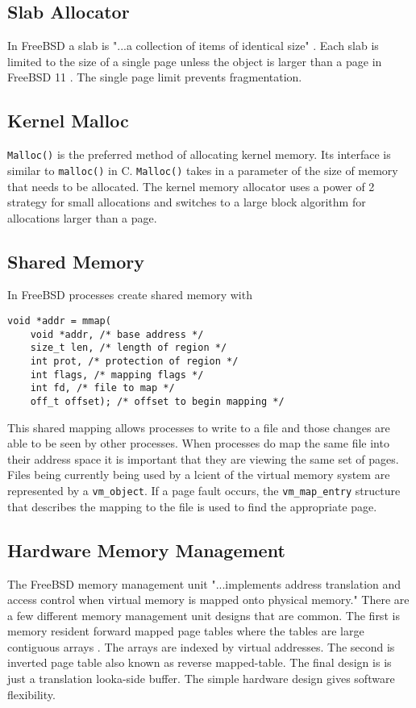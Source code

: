 \subsection{Slab Allocator} 
In FreeBSD a slab is "...a collection of items of identical size" \cite{Freebsdtext}. Each slab is limited to the size of a single page unless the object is larger than a page in FreeBSD 11 \cite{Freebsdtext}. The single page limit prevents fragmentation. 

\subsection{Kernel Malloc}
\lstinline{Malloc()} is the preferred method of allocating kernel memory. Its interface is similar to \lstinline{malloc()} in C. \lstinline{Malloc()} takes in a parameter of the size of memory that needs to be allocated. The kernel memory allocator uses a power of 2 strategy for small allocations and switches to a large block algorithm for allocations larger than a page.

\subsection{Shared Memory}
In FreeBSD processes create shared memory with
\begin{lstlisting}
void *addr = mmap(
    void *addr, /* base address */
    size_t len, /* length of region */
    int prot, /* protection of region */
    int flags, /* mapping flags */
    int fd, /* file to map */
    off_t offset); /* offset to begin mapping */
\end{lstlisting}
This shared mapping allows processes to write to a file and those changes are able to be seen by other processes. When processes do  map the same file into their address space it is important that they are viewing the same set of pages. Files being currently being used by a lcient of the virtual memory system are represented by a \lstinline{vm_object}\cite{Freebsdtext}. If a page fault occurs, the \lstinline{vm_map_entry} structure that describes the mapping to the file is used to find the appropriate page. 

\subsection{Hardware Memory Management}
The FreeBSD memory management unit "...implements address translation and access control when virtual memory is mapped onto physical memory."\cite{Freebsdtext} There are a few different memory management unit designs that are common. The first is memory resident forward mapped page tables where the tables are large contiguous arrays \cite{Freebsdtext}. The arrays are indexed by virtual addresses. The second is inverted page table also known as reverse mapped-table. The final design is is just a translation looka-side buffer. The simple hardware design gives software flexibility.
